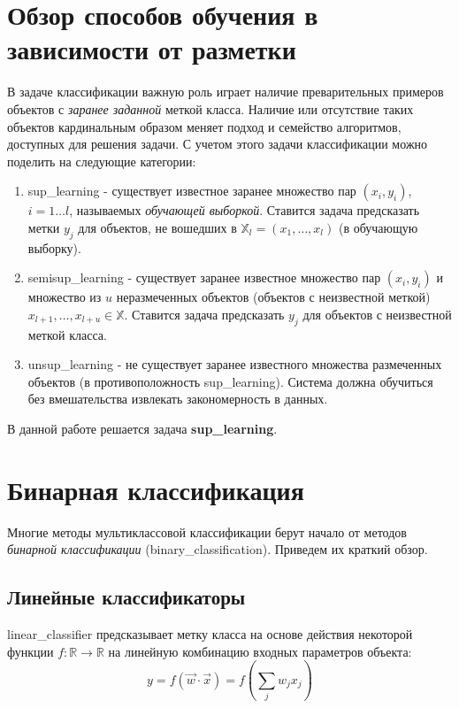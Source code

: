 \section{Обзор способов обучения в зависимости от разметки}
В задаче классификации важную роль играет наличие преварительных примеров объектов с \textit{заранее заданной} меткой класса.
Наличие или отсутствие таких объектов кардинальным образом меняет подход и семейство алгоритмов, доступных для решения задачи.
С учетом этого задачи классификации можно поделить на следующие категории:
\begin{enumerate}
    \item \Gls{sup_learning} - существует известное заранее множество пар $(x_i, y_i)$, $i=1\dots l$, называемых \textit{обучающей выборкой}.
        Ставится задача предсказать метки $y_j$ для объектов, не вошедших в $\mathbb{X}_l = (x_1, \dots, x_l)$ (в обучающую выборку).
    \item \Gls{semisup_learning} - существует заранее известное множество пар $(x_i, y_i)$ и множество из $u$ неразмеченных объектов (объектов с неизвестной меткой) $x_{l+1}, \dots, x_{l+u} \in \mathbb{X}$.
        Ставится задача предсказать $y_j$ для объектов с неизвестной меткой класса.
    \item \Gls{unsup_learning} - не существует заранее известного множества размеченных объектов (в противоположность \gls{sup_learning}).
        Система должна обучиться без вмешательства извлекать закономерность в данных.
\end{enumerate}
В данной работе решается задача \textbf{\gls{sup_learning}}.

\section{Бинарная классификация}
Многие методы мультиклассовой классификации берут начало от методов \textit{бинарной классификации} (\gls{binary_classification}).
Приведем их краткий обзор.
\subsection{Линейные классификаторы}
\Gls{linear_classifier} предсказывает метку класса на основе действия некоторой функции $f: \mathbb{R} \rightarrow \mathbb{R}$ на линейную комбинацию входных параметров объекта:
\begin{equation}
    \label{eq:linear_classifier}
    y = f (\vec{w} \cdot \vec{x}) = f \left( \sum_{j} w_j x_j \right)
\end{equation}

